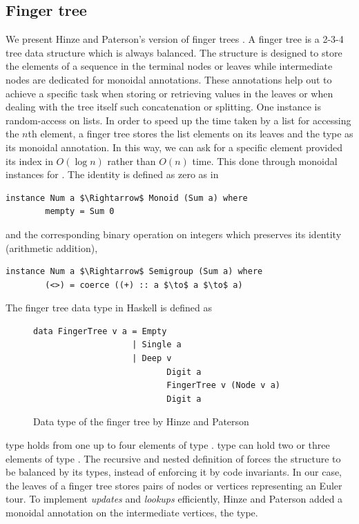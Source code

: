 \subsection{Finger tree} 

We present Hinze and Paterson's version of finger trees  \cite{FTs}. A finger tree is a 2-3-4 tree data structure which is always balanced. The structure is designed to store the elements of a sequence in the terminal nodes or leaves while intermediate nodes are dedicated for monoidal annotations. These annotations help out to achieve a specific task when storing or retrieving values in the leaves or when dealing with the tree itself such concatenation or splitting. One instance is random-access on lists. In order to speed up the time taken by a list for accessing the $n$th element, a finger tree stores the list elements on its leaves and the type  as its monoidal annotation. In this way, we can ask for a specific element provided its index in $O(\log n)$ rather than $O(n)$ time. This done through monoidal instances for . The identity is defined as zero as in 
\begin{lstlisting}[mathescape]
instance Num a $\Rightarrow$ Monoid (Sum a) where
        mempty = Sum 0
\end{lstlisting}

and the corresponding binary operation on integers which preserves its identity (arithmetic addition),
\begin{lstlisting}[mathescape]
instance Num a $\Rightarrow$ Semigroup (Sum a) where
        (<>) = coerce ((+) :: a $\to$ a $\to$ a)
\end{lstlisting}


The finger tree data type in Haskell is defined as

\begin{figure}[H]
\begin{lstlisting}
data FingerTree v a = Empty
                    | Single a 
                    | Deep v 
                           Digit a 
                           FingerTree v (Node v a) 
                           Digit a
\end{lstlisting}                           
\caption{Data type of the finger tree by Hinze and Paterson}
\label{fig:FTdatatype}
\end{figure}

 type holds from one up to four elements of type .  type can hold two or three elements of type . The recursive and nested definition of  forces the structure to be balanced by its types, instead of enforcing it by code invariants. In our case, the leaves of a finger tree stores pairs of nodes or vertices representing an Euler tour. To implement \textit{updates} and \textit{lookups} efficiently, Hinze and Paterson \cite{FTs} added a monoidal annotation on the intermediate vertices, the  type.

